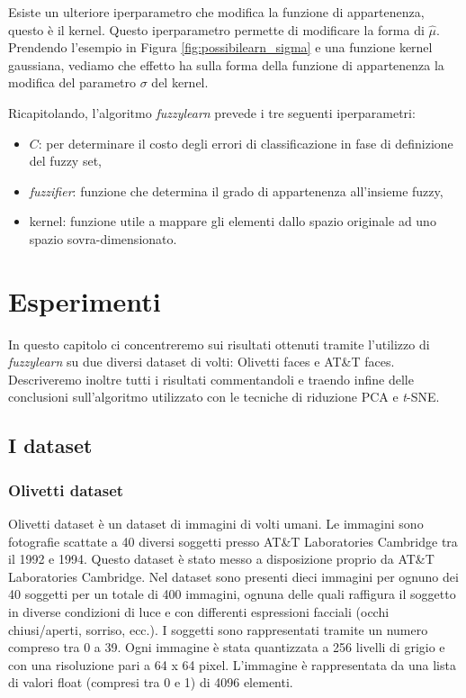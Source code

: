 \documentclass[12pt,italian]{report}
\begin{document}
Esiste un ulteriore iperparametro che modifica la funzione di appartenenza, questo è il kernel. Questo iperparametro permette di modificare la forma di $\hat \mu$. Prendendo l'esempio in Figura \ref{fig:possibilearn_sigma} e una funzione kernel gaussiana, vediamo che effetto ha sulla forma della funzione di appartenenza la modifica del parametro $ \sigma $ del kernel.

Ricapitolando, l'algoritmo \emph{fuzzylearn} prevede i tre seguenti iperparametri:
\begin{itemize}
	\item $C$: per determinare il costo degli errori di classificazione in fase di definizione del fuzzy set,
	\item \emph{fuzzifier}: funzione che determina il grado di appartenenza all'insieme fuzzy,
	\item kernel: funzione utile a mappare gli elementi dallo spazio originale ad uno spazio sovra-dimensionato.
\end{itemize}

\chapter{Esperimenti}
\label{cap:esperimenti}
In questo capitolo ci concentreremo sui risultati ottenuti tramite l'utilizzo di \emph{fuzzylearn} su due diversi dataset di volti: Olivetti faces e AT\&T faces. Descriveremo inoltre tutti i risultati commentandoli e traendo infine delle conclusioni sull'algoritmo utilizzato con le tecniche di riduzione PCA e \emph{t}-SNE.

\section{I dataset}
\subsection{Olivetti dataset}
Olivetti dataset è un dataset di immagini di volti umani. Le immagini sono fotografie scattate a 40 diversi soggetti presso AT\&T Laboratories Cambridge tra il 1992 e 1994. Questo dataset è stato messo a disposizione proprio da AT\&T Laboratories Cambridge.
Nel dataset sono presenti dieci immagini per ognuno dei 40 soggetti per un totale di 400 immagini, ognuna delle quali raffigura il soggetto in diverse condizioni di luce e con differenti espressioni facciali (occhi chiusi/aperti, sorriso, ecc.). I soggetti sono rappresentati tramite un numero compreso tra 0 a 39. Ogni immagine è stata quantizzata a 256 livelli di grigio e con una risoluzione pari a 64 x 64 pixel. L'immagine è rappresentata da una lista di valori float (compresi tra 0 e 1) di 4096 elementi. 
\end{document}
